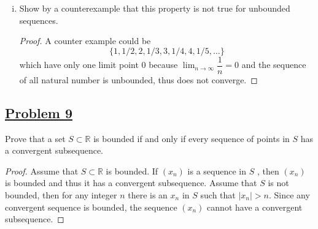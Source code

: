 \documentclass[10pt,letterpaper]{article}
\begin{document}
\begin{enumerate}[(i)]
		\item Show by a counterexample that this property is not true for unbounded sequences.
		\begin{proof}
		A counter example could be
		$$\{1, 1/2, 2, 1/3, 3, 1/4, 4, 1/5, \ldots\}$$
		which have only one limit point $0$ because $\displaystyle\lim_{n\to\infty} \dfrac{1}{n} = 0$
		and the sequence of all natural number is unbounded, thus does not converge.
		\end{proof}
	\end{enumerate}
	
	\subsection*{{\color{purple}\underline{Problem 9}}}
	Prove that a set $S \subset \mathbb{R}$ is bounded if and only if every sequence of points 
	in $S$ has a convergent subsequence.
	\begin{proof}
	Assume that $S \subset \mathbb{R}$ is bounded. 
	If $(x_n)$ is a sequence in $S$ , then $(x_n)$ is bounded and thus it has a convergent subsequence.
	Assume that $S$ is not bounded, then for any integer $n$ there is an $x_n$ in $S$ such that $|x_n| > n$. 
	Since any convergent sequence is bounded, the sequence $(x_n)$ cannot have a convergent subsequence.
	\end{proof}
\end{document}
